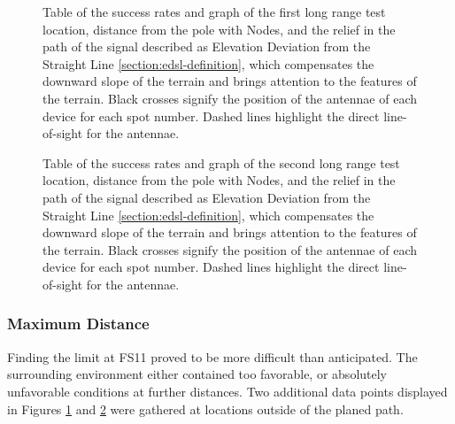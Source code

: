 \begin{figure}[p]
    \centering
    \begin{minipage}[t]{\textwidth}
        \centering
        
        \vspace{1em}
    \end{minipage}
    
    \caption{\label{fig:range-relief-far1}Table of the success rates and graph of the first long range test location, distance from the pole with Nodes, and the relief in the path of the signal described as Elevation Deviation from the Straight Line \ref{section:edsl-definition}, which compensates the downward slope of the terrain and brings attention to the features of the terrain. Black crosses signify the position of the antennae of each device for each spot number. Dashed lines highlight the direct line-of-sight for the antennae.}
\end{figure}

\begin{figure}[p]
    \centering
    \begin{minipage}[t]{\textwidth}
        \centering
        
        \vspace{1em}
    \end{minipage}
    
    \caption{\label{fig:range-relief-far2}Table of the success rates and graph of the second long range test location, distance from the pole with Nodes, and the relief in the path of the signal described as Elevation Deviation from the Straight Line \ref{section:edsl-definition}, which compensates the downward slope of the terrain and brings attention to the features of the terrain. Black crosses signify the position of the antennae of each device for each spot number. Dashed lines highlight the direct line-of-sight for the antennae.}
\end{figure}

\subsubsection{Maximum Distance}
Finding the limit at FS11 proved to be more difficult than anticipated. The surrounding environment either contained too favorable, or absolutely unfavorable conditions at further distances. Two additional data points displayed in Figures \ref{fig:range-relief-far1} and \ref{fig:range-relief-far2} were gathered at locations outside of the planed path.


